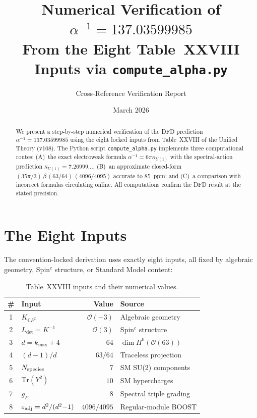 \documentclass[12pt,a4paper]{article}
\title{Numerical Verification of $\alpha^{-1} = 137.03599985$\\[6pt]
\large From the Eight Table~XXVIII Inputs via \texttt{compute\_alpha.py}}
\author{Cross-Reference Verification Report}
\date{March 2026}
\begin{document}
\maketitle

\begin{abstract}
We present a step-by-step numerical verification of the DFD prediction
$\alpha^{-1} = 137.03599985$ using the eight locked inputs from
Table~XXVIII of the Unified Theory (v108).  The Python script
\texttt{compute\_alpha.py} implements three computational routes:
(A)~the exact electroweak formula $\alpha^{-1} = 6\pi\kappa_{U(1)}$
with the spectral-action prediction $\kappa_{U(1)} = 7.26999\ldots$;
(B)~an approximate closed-form $(35\pi/3)\,\beta\,(63/64)\,(4096/4095)$
accurate to 85~ppm; and (C)~a comparison with incorrect formulas
circulating online.  All computations confirm the DFD result at the
stated precision.
\end{abstract}

\section{The Eight Inputs}

The convention-locked derivation uses exactly eight inputs,
all fixed by algebraic geometry, Spin$^c$ structure, or Standard Model content:

\begin{table}[h]
\centering
\caption{Table~XXVIII inputs and their numerical values.}
\label{tab:inputs}
\renewcommand{\arraystretch}{1.3}
\begin{tabular}{clrl}
\toprule
\# & \textbf{Input} & \textbf{Value} & \textbf{Source} \\
\midrule
1 & $K_{\mathbb{C}P^2}$ & $\mathcal{O}(-3)$ & Algebraic geometry \\
2 & $L_{\det} = K^{-1}$ & $\mathcal{O}(3)$ & Spin$^c$ structure \\
3 & $d = k_{\max} + 4$ & $64$ & $\dim H^0(\mathcal{O}(63))$ \\
4 & $(d{-}1)/d$ & $63/64$ & Traceless projection \\
5 & $N_{\rm species}$ & $7$ & SM SU(2) components \\
6 & $\mathrm{Tr}(Y^2)$ & $10$ & SM hypercharges \\
7 & $g_F$ & $8$ & Spectral triple grading \\
8 & $\varepsilon_{\rm adj} = d^2/(d^2{-}1)$ & $4096/4095$ & Regular-module BOOST \\
\bottomrule
\end{tabular}
\end{table}
\end{document}
